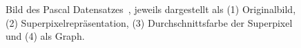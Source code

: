\begin{figure}[t]
\centering
{}
  \caption[\gls{Pascal}]{Bild des \gls{Pascal} Datensatzes~\cite{pascal_voc}, jeweils dargestellt als (1) Originalbild, (2) Superpixelrepräsentation, (3) Durchschnittsfarbe der Superpixel und (4) als Graph.}
\label{fig:pascal_voc}
\end{figure}
